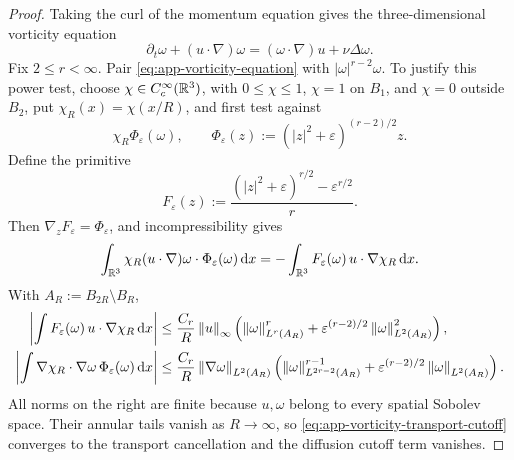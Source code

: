 \begin{proof}
Taking the curl of the momentum equation gives the three-dimensional
vorticity equation
\begin{equation}
 \partial_t\omega+(u\cdot\nabla)\omega
 = (\omega\cdot\nabla)u+\nu\Delta\omega.
 \label{eq:app-vorticity-equation}
\end{equation}
Fix \(2\le r<\infty\).  Pair
\eqref{eq:app-vorticity-equation} with
\(|\omega|^{r-2}\omega\).  To justify this power test, choose
\(\chi\in C_c^\infty(\mathbb R^3)\), with
\(0\le\chi\le1\), \(\chi=1\) on \(B_1\), and \(\chi=0\) outside
\(B_2\), put \(\chi_R(x)=\chi(x/R)\), and first test against
\[
 \chi_R\Phi_\varepsilon(\omega),
 \qquad
 \Phi_\varepsilon(z):=(|z|^2+\varepsilon)^{(r-2)/2}z.
\]
Define the primitive
\begin{equation}
 F_\varepsilon(z)
 :=\frac{(|z|^2+\varepsilon)^{r/2}-\varepsilon^{r/2}}{r}.
 \label{eq:app-vorticity-regularized-primitive}
\end{equation}
Then \(\nabla_zF_\varepsilon=\Phi_\varepsilon\), and incompressibility gives
\begin{equation}
 \int_{\mathbb R^3}\chi_R(u\cdot\nabla)\omega\cdot
 \Phi_\varepsilon(\omega)\,\mathrm d x
 =-\int_{\mathbb R^3}F_\varepsilon(\omega)\,
 u\cdot\nabla\chi_R\,\mathrm d x.
 \label{eq:app-vorticity-transport-cutoff}
\end{equation}
With \(A_R:=B_{2R}\setminus B_R\),
\begin{align}
 \left|\int F_\varepsilon(\omega)\,
 u\cdot\nabla\chi_R\,\mathrm d x\right|
 &\le\frac{C_r}{R}\left\lVert u\right\rVert_\infty
 \left(\left\lVert \omega\right\rVert_{L^r(A_R)}^r
 +\varepsilon^{(r-2)/2}\left\lVert \omega\right\rVert_{L^2(A_R)}^2\right),
 \label{eq:app-vorticity-transport-cutoff-bound}\\
 \left|\int \nabla\chi_R\cdot\nabla\omega\,
 \Phi_\varepsilon(\omega)\,\mathrm d x\right|
 &\le\frac{C_r}{R}\left\lVert \nabla\omega\right\rVert_{L^2(A_R)}
 \left(\left\lVert \omega\right\rVert_{L^{2r-2}(A_R)}^{r-1}
 +\varepsilon^{(r-2)/2}\left\lVert \omega\right\rVert_{L^2(A_R)}\right).
 \label{eq:app-vorticity-diffusion-cutoff-bound}
\end{align}
All norms on the right are finite because \(u,\omega\) belong to every
spatial Sobolev space.  Their annular tails vanish as \(R\to\infty\), so
\eqref{eq:app-vorticity-transport-cutoff} converges to the transport
cancellation and the diffusion cutoff term vanishes.


\end{proof}
